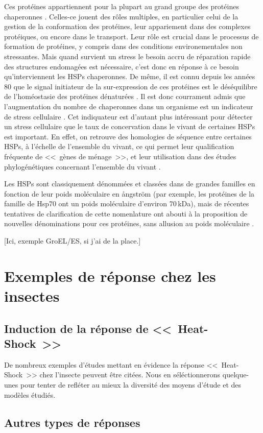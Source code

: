 	Ces protéines appartiennent pour la plupart au grand groupe des protéines chaperonnes \cite{federhoffmann1999}.
	Celles-ce jouent des rôles multiples, en particulier celui de la gestion de la conformation des protéines, leur appariement dans des complexes protéiques, ou encore dans le transport.
	Leur rôle est crucial dans le processus de formation de protéines, y compris dans des conditions environementales non stressantes.
	Mais quand survient un stress le besoin accru de réparation rapide des structures endomagées est nécessaire, c'est donc en réponse à ce besoin qu'interviennent les HSPs chaperonnes.
	De même, il est connu depuis les années 80 que le signal initiateur de la sur-expression de ces protéines est le déséquilibre de l'homéostasie des protéines dénaturées \cite{ananthan1986}.
	Il est donc courrament admis que l'augmentation du nombre de chaperonnes dans un organisme est un indicateur de stress cellulaire \cite{ryan1996}.
	Cet indiquateur est d'autant plus intéressant pour détecter un stress cellulaire que le taux de concervation dans le vivant de certaines HSPs est important.
	En effet, on retrouve des homologies de séquence entre certaines HSPs, à l'échelle de l'ensemble du vivant, ce qui permet leur qualification fréquente de <<~gènes de ménage~>>, et leur utilisation dans des études phylogénétiques concernant l'ensemble du vivant \cite{gupta1995}.

	Les HSPs sont classiquement dénommées et classées dans de grandes familles en fonction de leur poids moléculaire en ångström (par exemple, les protéines de la famille de Hsp70 ont un poids moléculaire d'environ 70\,kDa), mais de récentes tentatives de clarification de cette nomenlature ont abouti à la proposition de nouvelles dénominations pour ces protéines, sans allusion au poids moléculaire \cite{kampinga2009}.

	[Ici, exemple GroEL/ES, si j'ai de la place.]

	\section{Exemples de réponse chez les insectes}

		\subsection{Induction de la réponse de <<~Heat-Shock~>>}

		De nombreux exemples d'études mettant en évidence la réponse <<~Heat-Shock~>> chez l'insecte peuvent être citées.
		Nous en séléctionnerons quelque-unes pour tenter de refléter au mieux la diversité des moyens d'étude et des modèles étudiés.


		


		\subsection{Autres types de réponses} %

